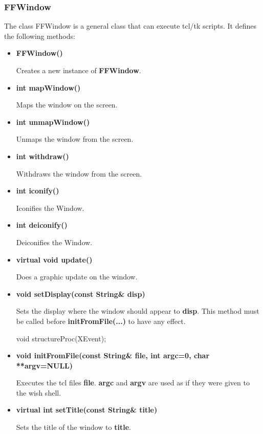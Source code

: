 
\subsubsection{FFWindow}

The class FFWindow is a general class that can execute tcl/tk scripts. It
defines the following methods:

\begin{itemize}

\item{\bf FFWindow()}

Creates a new instance of {\bf FFWindow}.

\item{\bf int mapWindow()}

Maps the window on the screen.

\item{\bf int unmapWindow()}

Unmaps the window from the screen.

\item{\bf int withdraw()}

Withdraws the window from the screen.

\item{\bf int iconify()}

Iconifies the Window.

\item{\bf int deiconify()}

Deiconifies the Window.

\item{\bf virtual void update()}

Does a graphic update on the window.

\item{\bf   void setDisplay(const String\& disp)}
  
  Sets the display where the window should appear to {\bf disp}.
  This method must be called before {\bf initFromFile(...)} to
  have any effect.

  void structureProc(XEvent);  
  
\item{\bf void initFromFile(const String\& file, int argc=0, char
    **argv=NULL)}
  
  Executes the tcl files {\bf file}. {\bf argc} and {\bf argv}
  are used as if they were given to the wish shell.

\item{\bf virtual int setTitle(const String\& title)}

Sets the title of the window to {\bf title}.


\end{itemize}

